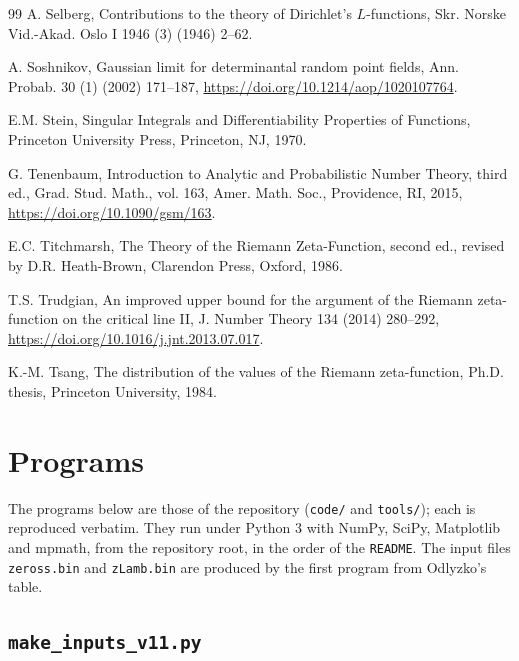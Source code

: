 \documentclass[preprint,12pt]{elsarticle}
\numberwithin{equation}{section}
\theoremstyle{plain}
\theoremstyle{definition}
\theoremstyle{remark}
\begin{document}
\begin{thebibliography}{99}
A. Selberg, Contributions to the theory of Dirichlet's $L$-functions, Skr. Norske Vid.-Akad. Oslo I 1946 (3) (1946) 2--62.

A. Soshnikov, Gaussian limit for determinantal random point fields, Ann. Probab. 30 (1) (2002) 171--187, \href{https://doi.org/10.1214/aop/1020107764}{https://doi.org/10.1214/aop/1020107764}.

E.M. Stein, Singular Integrals and Differentiability Properties of Functions, Princeton University Press, Princeton, NJ, 1970.

G. Tenenbaum, Introduction to Analytic and Probabilistic Number Theory, third ed., Grad. Stud. Math., vol. 163, Amer. Math. Soc., Providence, RI, 2015, \href{https://doi.org/10.1090/gsm/163}{https://doi.org/10.1090/gsm/163}.

E.C. Titchmarsh, The Theory of the Riemann Zeta-Function, second ed., revised by D.R. Heath-Brown, Clarendon Press, Oxford, 1986.

T.S. Trudgian, An improved upper bound for the argument of the Riemann zeta-function on the critical line II, J. Number Theory 134 (2014) 280--292, \href{https://doi.org/10.1016/j.jnt.2013.07.017}{https://doi.org/10.1016/j.jnt.2013.07.017}.

K.-M. Tsang, The distribution of the values of the Riemann zeta-function, Ph.D. thesis, Princeton University, 1984.

\end{thebibliography}

\appendix
\section{Programs}
\label{app:programs}
The programs below are those of the repository (\texttt{code/} and \texttt{tools/}); each is reproduced verbatim. They run under Python 3 with NumPy, SciPy, Matplotlib and mpmath, from the repository root, in the order of the \texttt{README}. The input files \texttt{zeross.bin} and \texttt{zLamb.bin} are produced by the first program from Odlyzko's table.

\subsection{\texttt{make\_inputs\_v11.py}}

\end{document}
